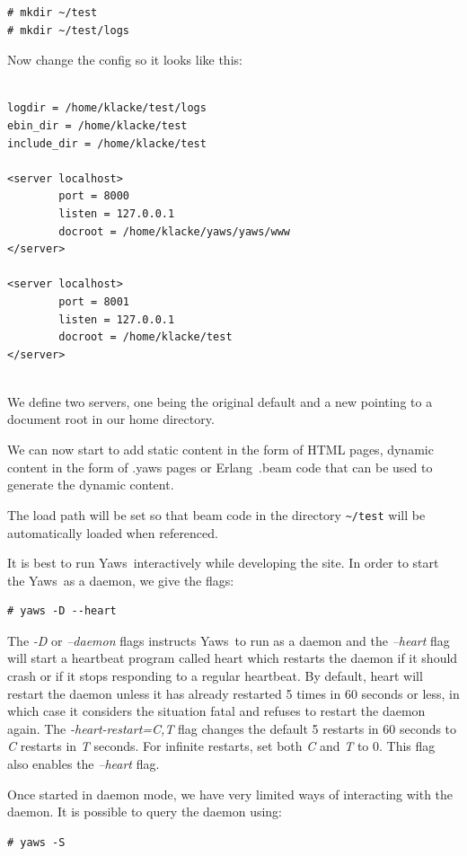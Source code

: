 \documentclass[11pt,oneside,english]{book}
\newcommand{\Erlang}            %
        {{\sc Erlang}}
\newcommand{\Yaws}            %
        {{\sc Yaws}}
\begin{document}
\begin{verbatim}
# mkdir ~/test
# mkdir ~/test/logs
\end{verbatim}

Now change the config so it looks like this:

\begin{verbatim}

logdir = /home/klacke/test/logs
ebin_dir = /home/klacke/test
include_dir = /home/klacke/test

<server localhost>
        port = 8000
        listen = 127.0.0.1
        docroot = /home/klacke/yaws/yaws/www
</server>

<server localhost>
        port = 8001
        listen = 127.0.0.1
        docroot = /home/klacke/test
</server>


\end{verbatim}

We define two servers, one being the original default
and a new pointing to a document root in our home directory.

We can now start to add static content in the form of
HTML pages, dynamic content in the form of .yaws pages or
\Erlang\ .beam code that can be used to generate the dynamic content.

The load path will be set so that beam code in the directory \verb+~/test+
will be automatically loaded when referenced.

It is best to run \Yaws\  interactively while developing the site.
In order to start the \Yaws\  as a daemon, we give the flags:
\begin{verbatim}
# yaws -D --heart
\end{verbatim}

The \textit{-D} or \textit{--daemon} flags instructs \Yaws\ to run as
a daemon and the \textit{--heart} flag will start a heartbeat program
called heart which restarts the daemon if it should crash or if it
stops responding to a regular heartbeat. By default, heart will
restart the daemon unless it has already restarted 5 times in 60
seconds or less, in which case it considers the situation fatal and
refuses to restart the daemon again. The \textit{-heart-restart=C,T}
flag changes the default 5 restarts in 60 seconds to \textit{C}
restarts in \textit{T} seconds. For infinite restarts, set both
\textit{C} and \textit{T} to 0. This flag also enables the
\textit{--heart} flag.

Once started in daemon mode, we have very limited ways of interacting
with the daemon. It is possible to query the daemon using:
\begin{verbatim}
# yaws -S
\end{verbatim}
\end{document}
